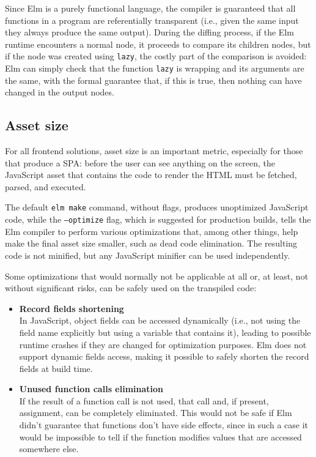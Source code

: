 Since Elm is a purely functional language, the compiler is guaranteed that all functions in a program are referentially transparent (i.e., given the same input they always produce the same output). During the diffing process, if the Elm runtime encounters a normal node, it proceeds to compare its children nodes, but if the node was created using \texttt{lazy}, the costly part of the comparison is avoided: Elm can simply check that the function \texttt{lazy} is wrapping and its arguments are the same, with the formal guarantee that, if this is true, then nothing can have changed in the output nodes.

\subsection{Asset size}
For all frontend solutions, asset size is an important metric, especially for those that produce a SPA: before the user can see anything on the screen, the JavaScript asset that contains the code to render the HTML must be fetched, parsed, and executed.

The default \texttt{elm make} command, without flags, produces unoptimized JavaScript code, while the \texttt{--optimize} flag, which is suggested for production builds, tells the Elm compiler to perform various optimizations that, among other things, help make the final asset size smaller, such as dead code elimination. The resulting code is not minified, but any JavaScript minifier can be used independently. \cite{noauthor_minification_nodate}

Some optimizations that would normally not be applicable at all or, at least, not without significant risks, can be safely used on the transpiled code:
\begin{itemize}
    \item \textbf{Record fields shortening}\\In JavaScript, object fields can be accessed dynamically (i.e., not using the field name explicitly but using a variable that contains it), leading to possible runtime crashes if they are changed for optimization purposes. Elm does not support dynamic fields access, making it possible to safely shorten the record fields at build time.
    \item \textbf{Unused function calls elimination}\\If the result of a function call is not used, that call and, if present, assignment, can be completely eliminated. This would not be safe if Elm didn't guarantee that functions don't have side effects, since in such a case it would be impossible to tell if the function modifies values that are accessed somewhere else.
\end{itemize}

